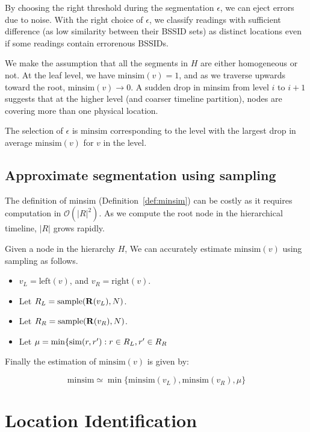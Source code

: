 By choosing the right threshold during the segmentation $\epsilon$, we can eject
errors due to noise.  With the right choice of
$\epsilon$, we classify readings with sufficient difference (as low similarity
between their BSSID sets) as distinct locations even if some readings contain
errorenous BSSIDs.

We make the assumption that all the segments in $H$ are either homogeneous or
not.  At the leaf level, we have $\mathrm{minsim}(v) = 1$, and as we traverse
upwards toward the root, $\mathrm{minsim}(v)\to 0$.  A sudden drop in minsim
from level $i$ to $i+1$ suggests that at the higher level (and coarser timeline
partition), nodes are covering more than one physical location.

The selection of $\epsilon$ is $\mathrm{minsim}$ corresponding to the level with
the largest drop in average $\mathrm{minsim}(v)$ for $v$ in the level.

\subsection{Approximate segmentation using sampling}

The definition of minsim (Definition~\ref{def:minsim}) can be costly as it
requires computation in $\mathcal{O}(|R|^2)$.  As we compute the root node in
the hierarchical timeline, $|R|$ grows rapidly.

Given a node in the hierarchy $H$, We can accurately estimate
$\mathrm{minsim}(v)$ using sampling as follows.

\begin{itemize}
    \item $v_L = \mathrm{left}(v)$, and $v_R = \mathrm{right}(v)$.
    \item Let $R_L = \mathrm{sample}(\mathbf{R}(v_L), N)$.
    \item Let $R_R = \mathrm{sample}(\mathbf{R}(v_R), N)$.
    \item Let $\mu = \mathrm{min}\{\mathrm{sim}(r,r'): r\in R_L, r'\in R_R$
\end{itemize}
Finally the estimation of $\mathrm{minsim}(v)$ is given by:

$$\mathrm{minsim} \simeq \min\{\mathrm{minsim}(v_L), \mathrm{minsim}(v_R), \mu\}$$

\section{Location Identification}

\label{sec:loc}

